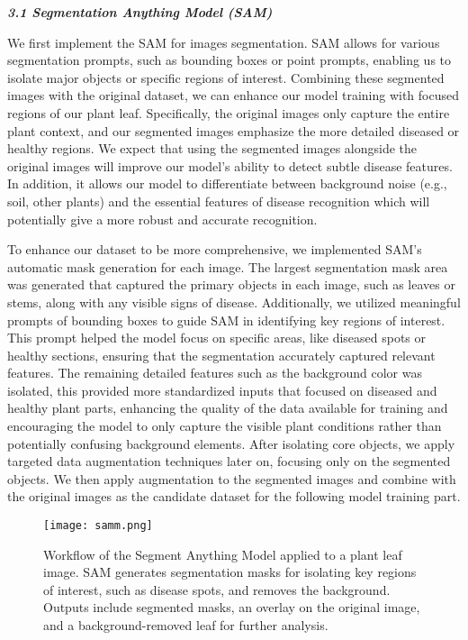 \documentclass{article}
\begin{document}
\textbf{\textit{3.1 Segmentation Anything Model (SAM)}}


We first implement the SAM for images segmentation. SAM allows for various segmentation prompts, such as bounding boxes or point prompts, enabling us to isolate major objects or specific regions of interest. Combining these segmented images with the original dataset, we can enhance our model training with focused regions of our plant leaf. Specifically, the original images only capture the entire plant context, and our segmented images emphasize the more detailed diseased or healthy regions. We expect that using the segmented images alongside the original images will improve our model’s ability to detect subtle disease features. In addition, it allows our model to differentiate between background noise (e.g., soil, other plants) and the essential features of disease recognition which will potentially give a more robust and accurate recognition.

To enhance our dataset to be more comprehensive, we implemented SAM’s automatic mask generation for each image. The largest segmentation mask area was generated that captured the primary objects in each image, such as leaves or stems, along with any visible signs of disease. Additionally, we utilized meaningful prompts of bounding boxes to guide SAM in identifying key regions of interest. This prompt helped the model focus on specific areas, like diseased spots or healthy sections, ensuring that the segmentation accurately captured relevant features. The remaining detailed features such as the background color was isolated, this provided more standardized inputs that focused on diseased and healthy plant parts, enhancing the quality of the data available for training and encouraging the model to only capture the visible plant conditions rather than potentially confusing background elements. After isolating core objects, we apply targeted data augmentation techniques later on, focusing only on the segmented objects. We then apply augmentation to the segmented images and combine with the original images as the candidate dataset for the following model training part.

\begin{figure}[H]
\centering
\captionsetup{font=small}
\texttt{[image: samm.png]}
\caption{Workflow of the Segment Anything Model applied to a plant leaf image. SAM generates segmentation masks for isolating key regions of interest, such as disease spots, and removes the background. Outputs include segmented masks, an overlay on the original image, and a background-removed leaf for further analysis.}
\label{fig:samm}
\end{figure}
\end{document}

